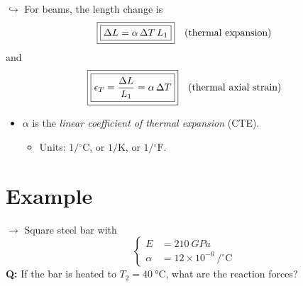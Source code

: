 \documentclass[11pt]{article}
\begin{document}
\noindent
$\hookrightarrow$ For beams, the length change is
\[
  \fbox{\fbox{$\Delta L = \alpha\,\Delta T\,L_1$}} \quad \text{(thermal expansion)}
\]
and
\[
  \fbox{\fbox{$\displaystyle \epsilon_T = \frac{\Delta L}{L_1} = \alpha\,\Delta T$}}
  \quad \text{(thermal axial strain)}
\]
\begin{itemize}[label=\then]
  \item $\alpha$ is the \emph{linear coefficient of thermal expansion} (CTE).
  \begin{itemize}[label=\then]
    \item Units: $1/{}^\circ\mathrm{C}$, or $1/\mathrm{K}$, or $1/{}^\circ\mathrm{F}$.
  \end{itemize}
\end{itemize}

\section*{Example}

\noindent
\begin{minipage}[c]{0.55\textwidth}
\centering
{}
\end{minipage}%
\hfill
\begin{minipage}[c]{0.42\textwidth}
$\rightarrow$ Square steel bar with
\[
  \left\{
  \begin{aligned}
    E &= \SI{210}{GPa} \\
    \alpha &= 12 \times 10^{-6}\ /{}^\circ\mathrm{C}
  \end{aligned}
  \right.
\]
\textbf{Q:} If the bar is heated to $T_2 = \SI{40}{\celsius}$, what are the reaction
forces?
\end{minipage}
\end{document}
